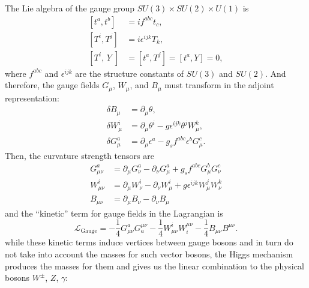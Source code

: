 The Lie algebra of the gauge group $SU(3)\times SU(2)\times U(1)$ is
\begin{equation}
\begin{aligned}
	{\left[t^{a}, t^{b}\right] } &=i f^{a b c} t_{c}, \\
	{\left[T^{i}, T^{j}\right] } &=i \epsilon^{i j k} T_{k}, \\
	{\left[T^{i}, \, Y\;\right] } &=\left[t^{a}, T^{j}\right]=\left[t^{a}, Y\right]=0,
\end{aligned}
\end{equation}
where $f^{a b c}$ and $\epsilon^{i j k}$ are the structure constants of $SU(3)$ and $SU(2)$. And therefore, the gauge fields $G_\mu$, $W_\mu$, and $B_\mu$ must transform in the adjoint representation: 
\begin{equation}
	\begin{aligned}
		\delta B_{\mu} &=\partial_{\mu} \theta, \\
		\delta W_{\mu}^{i} &=\partial_{\mu} \theta^{i}-g \epsilon^{i j k} \theta^{j} W_{\mu}^{k}, \\
		\delta G_{\mu}^{a} &=\partial_{\mu} \epsilon^{a}-g_{s} f^{a b c} \epsilon^{b} G_{\mu}^{c}.
	\end{aligned}
\end{equation}
Then, the curvature strength tensors are
\begin{equation}
\begin{aligned}
	G_{\mu \nu}^{a} &=\partial_{\mu} G_{\nu}^{a}-\partial_{\nu} G_{\mu}^{a}+g_{s} f^{a b c} G_{\mu}^{b} G_{\nu}^{c} \\
	W_{\mu \nu}^{i} &=\partial_{\mu} W_{\nu}^{i}-\partial_{\nu} W_{\mu}^{i}+g \epsilon^{i j k} W_{\mu}^{j} W_{\nu}^{k} \\
	B_{\mu \nu} &=\partial_{\mu} B_{\nu}-\partial_{\nu} B_{\mu}
\end{aligned}
\end{equation}
and the ``kinetic'' term for gauge fields in the Lagrangian is  
\begin{equation}
\mathcal{L}_{\text{Gauge}}=-\frac{1}{4} G_{\mu \nu}^{a} G_{a}^{\mu \nu}-\frac{1}{4} W_{\mu \nu}^{i} W_{i}^{\mu \nu}-\frac{1}{4} B_{\mu \nu} B^{\mu \nu}.
\end{equation}
while these kinetic terms induce vertices between gauge bosons and in turn do not take into account the masses for such vector bosons, the Higgs mechanism produces the masses for them and gives us the linear combination to the physical bosons $W^\pm$, $Z$, $\gamma$:
